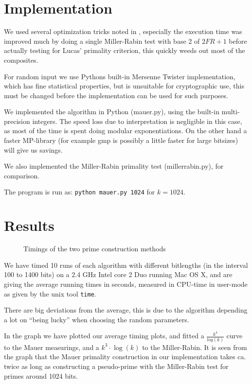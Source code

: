 \documentclass[11pt,a4paper]{article}
\begin{document}
\section{Implementation}

We used several optimization tricks noted in \cite{Menezes:1997:HAC}, especially the
execution time was improved much by doing a single Miller-Rabin test
with base 2 of $2FR+1$ before actually testing for Lucas' primality
criterion, this quickly weeds out most of the composites.

For random input we use Pythons built-in Mersenne Twister
implementation, which has fine statistical properties, but is
unsuitable for cryptographic use, this must be changed before the
implementation can be used for such purposes.

We implemented the algorithm in Python (mauer.py), using the built-in
multi-precision integers.  The speed loss due to interpretation is
negligible in this case, as most of the time is spent doing modular
exponentiations. On the other hand a faster MP-library (for example
gmp is possibly a little faster for large bitsizes) will give us
savings.

We also implemented the Miller-Rabin primality test (millerrabin.py),
for comparison.

The program is run as: \verb|python mauer.py 1024| for $k=1024$.

\section{Results}
\begin{figure}[h]
  \centering
  \caption{Timings of the two prime construction methods}
  \label{fig:timings}
\end{figure}

We have timed 10 runs of each algorithm with different bitlengths (in
the interval 100 to 1400 bits) on a 2.4 GHz Intel core 2 Duo running
Mac OS X, and are giving the average running times in seconds,
measured in CPU-time in user-mode as given by the unix tool
\verb|time|. 

There are big deviations from the average, this is due to the
algorithm depending a lot on ``being lucky'' when choosing the random
parameters.

In the graph we have plotted our average timing plots, and fitted a
$\frac{k^4}{log(k)}$ curve to the Mauer measurings, and a
$k^3\cdot\log(k)$ to the Miller-Rabin.  It is seen from the graph that the Mauer
primality construction in our implementation takes ca. twice as long
as constructing a pseudo-prime with the Miller-Rabin test for primes
around 1024 bits.
\end{document}
